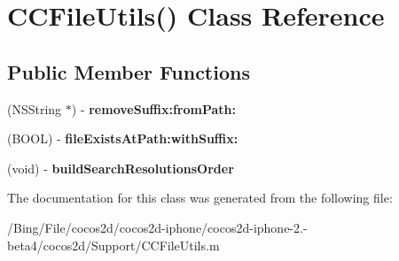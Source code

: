 \hypertarget{interface_c_c_file_utils_07_08}{\section{C\-C\-File\-Utils() Class Reference}
\label{interface_c_c_file_utils_07_08}
}
\subsection*{Public Member Functions}
\begin{DoxyCompactItemize}
\item 
\hypertarget{interface_c_c_file_utils_07_08_a90d2df730dcbab91a40995fac60491ed}{(N\-S\-String $\ast$) -\/ {\bfseries remove\-Suffix\-:from\-Path\-:}}\label{interface_c_c_file_utils_07_08_a90d2df730dcbab91a40995fac60491ed}

\item 
\hypertarget{interface_c_c_file_utils_07_08_ab54bb6678572ace491e2cc6904b4eb81}{(B\-O\-O\-L) -\/ {\bfseries file\-Exists\-At\-Path\-:with\-Suffix\-:}}\label{interface_c_c_file_utils_07_08_ab54bb6678572ace491e2cc6904b4eb81}

\item 
\hypertarget{interface_c_c_file_utils_07_08_a3373e970d3061d69addd9283d2a9530e}{(void) -\/ {\bfseries build\-Search\-Resolutions\-Order}}\label{interface_c_c_file_utils_07_08_a3373e970d3061d69addd9283d2a9530e}

\end{DoxyCompactItemize}


The documentation for this class was generated from the following file\-:\begin{DoxyCompactItemize}
\item 
/\-Bing/\-File/cocos2d/cocos2d-\/iphone/cocos2d-\/iphone-\/2.-\/beta4/cocos2d/\-Support/C\-C\-File\-Utils.\-m\end{DoxyCompactItemize}
